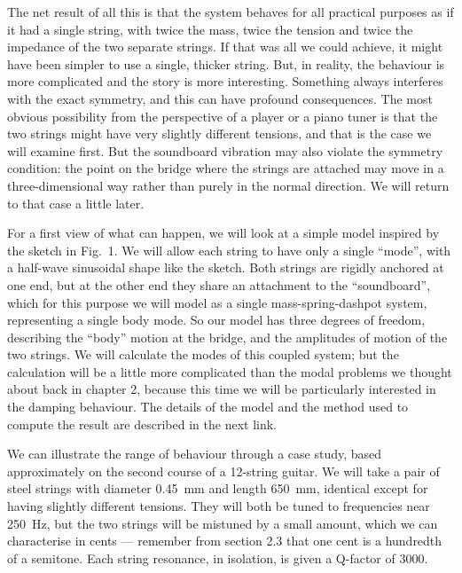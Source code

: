   The net result of all this is that the system behaves for all practical 
  purposes as if it had a single string, with twice the mass, twice the tension 
  and twice the impedance of the two separate strings. If that was all we could 
  achieve, it might have been simpler to use a single, thicker string. But, in 
  reality, the behaviour is more complicated and the story is more interesting. 
  Something always interferes with the exact symmetry, and this can have 
  profound consequences. The most obvious possibility from the perspective of a 
  player or a piano tuner is that the two strings might have very slightly 
  different tensions, and that is the case we will examine first. But the 
  soundboard vibration may also violate the symmetry condition: the point on 
  the bridge where the strings are attached may move in a three-dimensional way 
  rather than purely in the normal direction. We will return to that case a 
  little later. 

  For a first view of what can happen, we will look at a simple model inspired 
  by the sketch in Fig.\ 1. We will allow each string to have only a single 
  “mode”, with a half-wave sinusoidal shape like the sketch. Both strings are 
  rigidly anchored at one end, but at the other end they share an attachment to 
  the “soundboard”, which for this purpose we will model as a single 
  mass-spring-dashpot system, representing a single body mode. So our model has 
  three degrees of freedom, describing the “body” motion at the bridge, and the 
  amplitudes of motion of the two strings. We will calculate the modes of this 
  coupled system; but the calculation will be a little more complicated than 
  the modal problems we thought about back in chapter 2, because this time we 
  will be particularly interested in the damping behaviour. The details of the 
  model and the method used to compute the result are described in the next 
  link. 

  We can illustrate the range of behaviour through a case study, based 
  approximately on the second course of a 12-string guitar. We will take a pair 
  of steel strings with diameter 0.45~mm and length 650~mm, identical except 
  for having slightly different tensions. They will both be tuned to 
  frequencies near 250~Hz, but the two strings will be mistuned by a small 
  amount, which we can characterise in cents --- remember from section 2.3 that 
  one cent is a hundredth of a semitone. Each string resonance, in isolation, 
  is given a Q-factor of 3000. 

